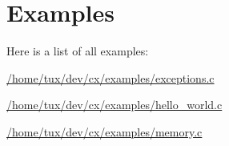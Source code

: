 \section{Examples}
Here is a list of all examples\+:\begin{DoxyCompactItemize}
\item 
\hyperlink{a00078}{/home/tux/dev/cx/examples/exceptions.\+c}
\item 
\hyperlink{a00080}{/home/tux/dev/cx/examples/hello\+\_\+world.\+c}
\item 
\hyperlink{a00082}{/home/tux/dev/cx/examples/memory.\+c}
\end{DoxyCompactItemize}
